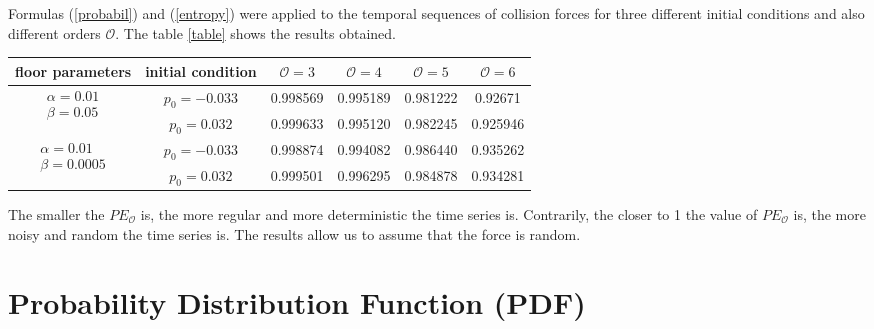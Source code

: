 \documentclass[reprint, aps, pre,nofootinbib]{revtex4-1}
\providecommand{\tabularnewline}{\\}
\begin{document}
Formulas (\ref{probabil}) and (\ref{entropy}) were applied to the
temporal sequences of collision forces for three different initial
conditions and also different orders $\mathcal{O}$. The table \ref{table}
shows the results obtained. 
\begin{table*}
\centering{}%
\begin{tabular}{|c|c|c|c|c|c|}
\hline 
floor parameters & initial condition & $\mathcal{O}=3$ & $\mathcal{O}=4$ & $\mathcal{O}=5$ & $\mathcal{O}=6$\tabularnewline
\hline 
\hline 
\multirow{2}{*}{$\begin{array}{c}
\alpha=0.01\\
\beta=0.05
\end{array}$} & $p_{0}=-0.033$ & \multirow{1}{*}{0.998569} & \multirow{1}{*}{0.995189} & \multirow{1}{*}{0.981222} & \multirow{1}{*}{0.92671}\tabularnewline
\cline{2-6} \cline{3-6} \cline{4-6} \cline{5-6} \cline{6-6} 
 & $p_{0}=0.032$ & \multirow{1}{*}{0.999633} & 0.995120 & 0.982245 & 0.925946\tabularnewline
\hline 
\multirow{2}{*}{$\begin{array}{c}
\alpha=0.01\\
\beta=0.0005
\end{array}$} & $p_{0}=-0.033$ & 0.998874 & 0.994082 & 0.986440 & 0.935262\tabularnewline
\cline{2-6} \cline{3-6} \cline{4-6} \cline{5-6} \cline{6-6} 
 & $p_{0}=0.032$ & 0.999501 & 0.996295 & 0.984878 & 0.934281\tabularnewline
\hline 
\end{tabular}\caption{The initial conditions are chosen in order to vary the initial point
$(x(p_{0}),y(p_{0}))$ and keeping the energy $\bar{E}=4$ constant.}
\label{table}
\end{table*}
The smaller the $PE_{\mathcal{O}}$ is, the more regular and more
deterministic the time series is. Contrarily, the closer to 1 the
value of $PE_{\mathcal{O}}$ is, the more noisy and random the time
series is. The results allow us to assume that the force is random.

\section{Probability Distribution Function (PDF)}
\end{document}
